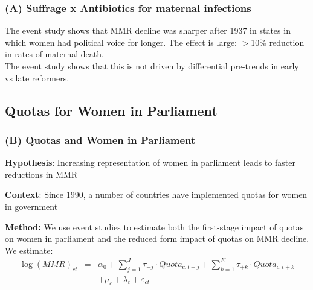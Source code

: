 \documentclass[9pt,letterpaper,subeqn]{beamer}
\begin{document}

\begin{frame}
\frametitle{(A) Suffrage x Antibiotics for maternal infections}
The event study shows that MMR decline was sharper after 1937 in states in which women had political voice for longer. The effect is large: $>$10\% reduction in rates of maternal death.\\ \vspace{4mm}
The event study shows that this is not driven by differential pre-trends in early vs late reformers.
\end{frame}


\subsection{Quotas for  Women in Parliament}
\begin{frame}[label=Quotas]
\frametitle{(B) Quotas and Women in Parliament}
\textbf{Hypothesis}: Increasing representation of women in parliament leads to faster
reductions in MMR \\
\vspace{3mm}

\textbf{Context}: Since 1990, a number of countries have implemented quotas for women in government
 \\
\vspace{3mm}

\textbf{Method:} We use event studies to estimate both the first-stage impact of quotas on women in parliament and the reduced form impact of quotas on MMR decline. We estimate:
\begin{eqnarray}
  \log(MMR)_{ct} &=& \alpha_0 + \sum_{j=1}^J \tau_{-j}\cdot Quota_{c,t-j} + \sum_{k=1}^K \tau_{+k}\cdot Quota_{c,t+k} \nonumber \\
  && + \mu_c + \lambda_t + \varepsilon_{ct} \nonumber
\end{eqnarray}



\end{frame}
\end{document}
